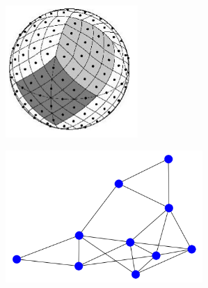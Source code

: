 \documentclass[landscape,a0paper,blockverticalspace = 5mm]{tikzposter}
\begin{document}
\begin{columns}
{{\begin{center}
\begin{minipage}{0.16\linewidth}
\begin{center}
          \end{center}
      \end{minipage}
      \begin{minipage}{0.1\linewidth}
      \begin{center}


         \end{center}
      \end{minipage} \hspace{0cm}
	\begin{minipage}{0.16\linewidth}
	\begin{center}
          \includegraphics[height=5cm]{figures/sphere.png}


          \end{center}
      \end{minipage}
   \begin{minipage}{0.1\linewidth}
      \begin{center}


         \end{center}
      \end{minipage} \hspace{0cm}
	\begin{minipage}{0.16\linewidth}
	\begin{center}
          \includegraphics[height=5cm]{figures/graph.png}



\end{center}
\end{minipage}
\end{center}}}
\end{columns}
\end{document}
